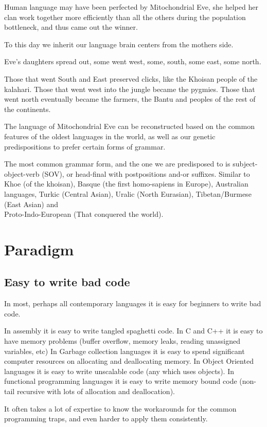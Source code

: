 \begin{multicols}{2}
Human language may have been perfected by Mitochondrial Eve, she helped her clan
work together more efficiently than all the others during the population
bottleneck, and thus came out the winner.

To this day we inherit our language brain centers from the mothers side.  

Eve's daughters spread out, some went west, some, south, some east, some north.

Those that went South and East preserved clicks, like the Khoisan people of the
kalahari.
Those that went west into the jungle became the pygmies.
Those that went north eventually became the farmers, the Bantu and peoples of
the rest of the continents.

The language of Mitochondrial Eve can be reconstructed based on the common
features of the oldest languages in the world, as well as our genetic
predispositions to prefer certain forms of grammar.

The most common grammar form, and the one we are predisposed to is
subject-object-verb (SOV), or head-final with postpositions and-or suffixes.
Similar to Khoe (of the khoisan), Basque (the first homo-sapiens in Europe), 
Australian languages, Turkic (Central Asian), Uralic (North Eurasian),
Tibetan/Burmese (East Asian) and \\ Proto-Indo-European (That conquered the world).



\section{Paradigm}
\subsection{Easy to write bad code}
In most, perhaps all contemporary languages it is easy for beginners to write
bad code. 

In assembly it is easy to write tangled spaghetti code.
In C and C++ it is easy to have memory problems (buffer overflow, memory leaks,
reading unassigned variables, etc)
In Garbage collection languages it is easy to spend significant computer
resources on allocating and deallocating memory. 
In Object Oriented languages it is easy to write unscalable code (any which uses
objects).
In functional programming languages it is easy to write memory bound code
(non-tail recursive with lots of allocation and deallocation).

It often takes a lot of expertise to know the workarounds for the common
programming traps, and even harder  to apply them consistently.


\end{multicols}
